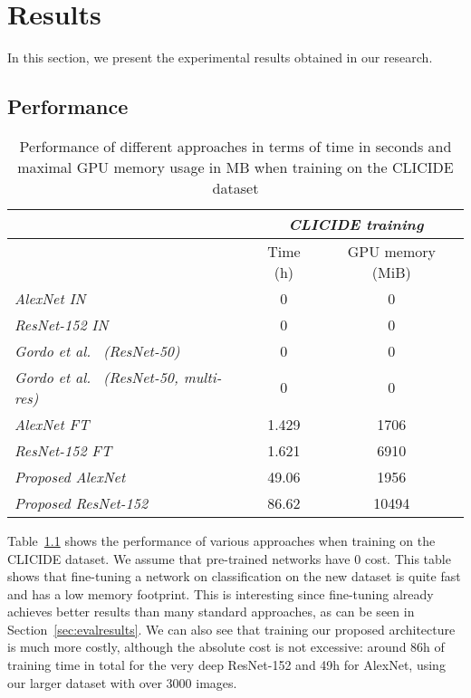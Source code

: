 
\chapter{Results}
In this section, we present the experimental results obtained in our
research.

\section{Performance}\label{sec:perfresults}

\begin{table}
\centering
\begin{tabular}{|l|c|c|}
\hline & \multicolumn{2}{c|}{\emph{CLICIDE training}}\\
\hline & Time (h) & GPU memory (MiB)\\
\hline \emph{AlexNet IN} & 0 & 0\\
\hline \emph{ResNet-152 IN} & 0 & 0\\
\hline \emph{Gordo et al.~\cite{gordo_deep_2016} (ResNet-50)} & 0 & 0\\
\hline \emph{Gordo et al.~\cite{gordo_deep_2016} (ResNet-50, multi-res)}
& 0 & 0\\
\hline \emph{AlexNet FT} & 1.429 & 1706\\
\hline \emph{ResNet-152 FT} & 1.621 & 6910\\
\hline \emph{Proposed AlexNet} & 49.06 & 1956\\
\hline \emph{Proposed ResNet-152} & 86.62 & 10494\\
\hline
\end{tabular}
\caption{Performance of different approaches in terms of time in seconds and
maximal GPU memory usage in MB when training on the CLICIDE dataset
\label{tab:perftrain}}
\end{table}

Table~\ref{tab:perftrain} shows the performance of various approaches
when training on the CLICIDE dataset. We assume that pre-trained
networks have 0 cost. This table shows that fine-tuning a network
on classification on the new dataset is quite fast and has a low memory
footprint. This is interesting since fine-tuning already achieves better
results than many standard approaches, as can be seen in
Section~\ref{sec:evalresults}.
We can also see that training our proposed architecture is much
more costly, although the absolute cost is not excessive:
around 86h of training time in total for the very deep ResNet-152
and 49h for AlexNet, using our larger dataset with over 3000 images.


